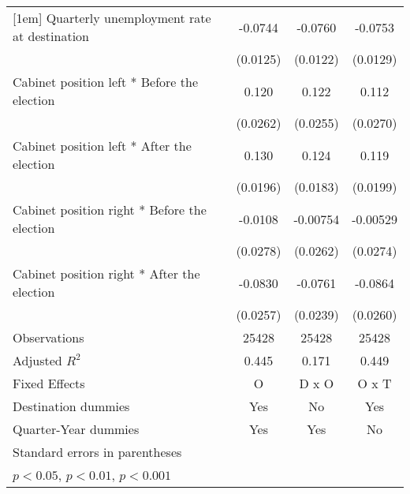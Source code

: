 \begin{table}[htbp]
\begin{tabular}{l*{3}{c}}
[1em]
Quarterly unemployment rate at destination&     -0.0744\sym{***}&     -0.0760\sym{***}&     -0.0753\sym{***}\\
                    &    (0.0125)         &    (0.0122)         &    (0.0129)         \\
[1em]
Cabinet position left * Before the election&       0.120\sym{***}&       0.122\sym{***}&       0.112\sym{***}\\
                    &    (0.0262)         &    (0.0255)         &    (0.0270)         \\
[1em]
Cabinet position left * After the election&       0.130\sym{***}&       0.124\sym{***}&       0.119\sym{***}\\
                    &    (0.0196)         &    (0.0183)         &    (0.0199)         \\
[1em]
Cabinet position right * Before the election&     -0.0108         &    -0.00754         &    -0.00529         \\
                    &    (0.0278)         &    (0.0262)         &    (0.0274)         \\
[1em]
Cabinet position right * After the election&     -0.0830\sym{**} &     -0.0761\sym{**} &     -0.0864\sym{**} \\
                    &    (0.0257)         &    (0.0239)         &    (0.0260)         \\
\hline
Observations        &       25428         &       25428         &       25428         \\
Adjusted \(R^{2}\)  &       0.445         &       0.171         &       0.449         \\
Fixed Effects       &           O         &       D x O         &       O x T         \\
Destination dummies &         Yes         &          No         &         Yes         \\
Quarter-Year dummies&         Yes         &         Yes         &          No         \\
\hline\hline
\multicolumn{4}{l}{\footnotesize Standard errors in parentheses}\\
\multicolumn{4}{l}{\footnotesize \sym{*} \(p<0.05\), \sym{**} \(p<0.01\), \sym{***} \(p<0.001\)}\\
\end{tabular}
\end{table}
